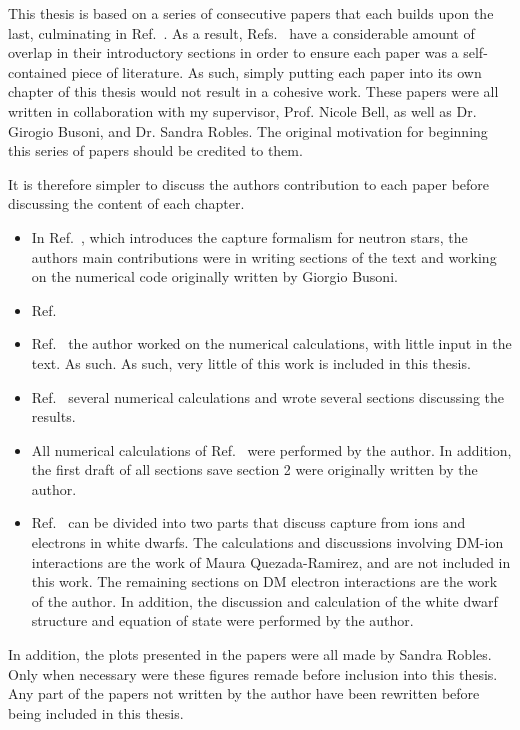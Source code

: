 \begin{preface}
This thesis is based on a series of consecutive papers that each builds upon the last, culminating in Ref.~\cite{Bell:2023ysh_dec_ThermalizationAnnihilationDark}. As a result, Refs.~\cite{Bell:2020jou_sep_ImprovedTreatmentDark, Bell:2020lmm_mar_ImprovedTreatmentDark, Bell:2020obw_sep_NucleonStructureStrong, Anzuini:2021lnv_nov_Improvedtreatmentdark} have a considerable amount of overlap in their introductory sections in order to ensure each paper was a self-contained piece of literature. As such, simply putting each paper into its own chapter of this thesis would not result in a cohesive work. 
These papers were all written in collaboration with my supervisor, Prof. Nicole Bell, as well as Dr. Girogio Busoni, and Dr. Sandra Robles. The original motivation for beginning this series of papers should be credited to them.

It is therefore simpler to discuss the authors contribution to each paper before discussing the content of each chapter.

\begin{itemize}
    \item In Ref.~\cite{Bell:2020jou_sep_ImprovedTreatmentDark}, which introduces the capture formalism for neutron stars, the authors main contributions were in writing sections of the text and working on the numerical code originally written by Giorgio Busoni. 
    \item Ref.~\cite{Bell:2020lmm_mar_ImprovedTreatmentDark}
    \item Ref.~\cite{Bell:2020obw_sep_NucleonStructureStrong} the author worked on the numerical calculations, with little input in the text. As such. As such, very little of this work is included in this thesis.
    \item Ref.~\cite{Anzuini:2021lnv_nov_Improvedtreatmentdark} several numerical calculations and wrote several sections discussing the results. 
    \item All numerical calculations of Ref.~\cite{Bell:2023ysh_dec_ThermalizationAnnihilationDark} were performed by the author. In addition, the first draft of all sections save section 2 were originally written by the author.
    \item Ref.~\cite{Bell:2021fye_oct_Improvedtreatmentdark} can be divided into two parts that discuss capture from ions and electrons in white dwarfs. The calculations and discussions involving DM-ion interactions are the work of Maura Quezada-Ramirez, and are not included in this work. The remaining sections on DM electron interactions are the work of the author. In addition, the discussion and calculation of the white dwarf structure and equation of state were performed by the author.
\end{itemize}
In addition, the plots presented in the papers were all made by Sandra Robles. Only when necessary were these figures remade before inclusion into this thesis.
Any part of the papers not written by the author have been rewritten before being included in this thesis. 


\end{preface}
